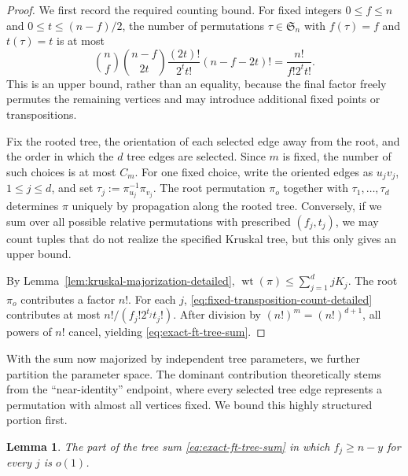 \documentclass[11pt,reqno]{amsart}
\newtheorem{lemma}[theorem]{Lemma}
\theoremstyle{definition}
\theoremstyle{remark}
\renewcommand\le{\leqslant}
\renewcommand\ge{\geqslant}
\newcommand{\wt}{\operatorname{wt}}
\begin{document}
\begin{proof}
We first record the required counting bound. For fixed integers $0\le f\le n$ and $0\le t\le (n-f)/2$, the number of permutations $\tau\in\mathfrak S_n$ with $f(\tau)=f$ and $t(\tau)=t$ is at most
\begin{equation}\label{eq:fixed-transposition-count-detailed}
        \binom nf\binom{n-f}{2t}\frac{(2t)!}{2^t t!}(n-f-2t)!
        =\frac{n!}{f!2^t t!}.
\end{equation}
This is an upper bound, rather than an equality, because the final factor freely permutes the remaining vertices and may introduce additional fixed points or transpositions.

Fix the rooted tree, the orientation of each selected edge away from the root, and the order in which the $d$ tree edges are selected. Since $m$ is fixed, the number of such choices is at most $C_m$. For one fixed choice, write the oriented edges as $u_jv_j$, $1\le j\le d$, and set $\tau_j:=\pi_{u_j}^{-1}\pi_{v_j}$. The root permutation $\pi_o$ together with $\tau_1,\ldots,\tau_d$ determines $\pi$ uniquely by propagation along the rooted tree. Conversely, if we sum over all possible relative permutations with prescribed $(f_j,t_j)$, we may count tuples that do not realize the specified Kruskal tree, but this only gives an upper bound.

By Lemma~\ref{lem:kruskal-majorization-detailed},
$\wt(\pi)\le \sum_{j=1}^d jK_j$. The root $\pi_o$ contributes a factor $n!$. For each $j$, \eqref{eq:fixed-transposition-count-detailed} contributes at most $n!/(f_j!2^{t_j}t_j!)$. After division by $(n!)^m=(n!)^{d+1}$, all powers of $n!$ cancel, yielding \eqref{eq:exact-ft-tree-sum}.
\end{proof}

With the sum now majorized by independent tree parameters, we further partition the parameter space. The dominant contribution theoretically stems from the ``near-identity'' endpoint, where every selected tree edge represents a permutation with almost all vertices fixed. We bound this highly structured portion first.

\begin{lemma}\label{lem:near-endpoint-contribution-detailed}
The part of the tree sum \eqref{eq:exact-ft-tree-sum} in which $f_j\ge n-y$ for every $j$ is $o(1)$.
\end{lemma}
\end{document}
